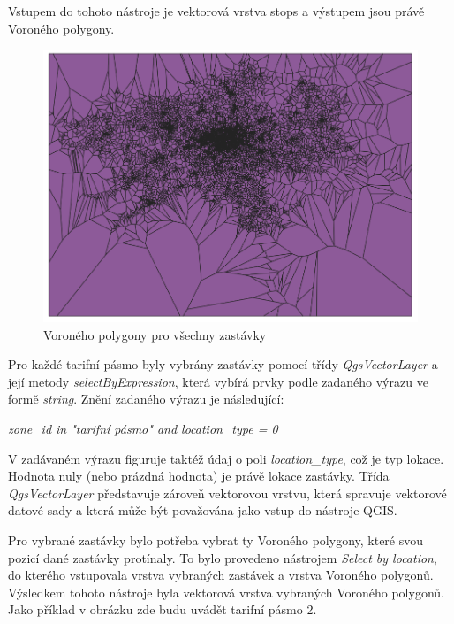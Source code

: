 Vstupem do tohoto nástroje je vektorová vrstva stops a výstupem jsou právě Voroného polygony.

\begin{figure}[H] \centering
    \includegraphics[width=400pt]{./pictures/voronoi-stops.png}
    \caption[Voroného polygony pro všechny zastávky]{Voroného polygony pro všechny zastávky}
	\label{fig:voronoi-stops}              
\end{figure}
  
Pro každé tarifní pásmo byly vybrány zastávky pomocí třídy \textit{QgsVectorLayer}
a její metody \textit{selectByExpression}, která vybírá prvky podle zadaného výrazu ve formě \textit{string}.
Znění zadaného výrazu je následující:

\textit{zone\_id in "tarifní pásmo" and location\_type = 0}

V zadávaném výrazu figuruje taktéž údaj o poli \textit{location\_type}, což je typ lokace. 
Hodnota nuly (nebo prázdná hodnota) je právě lokace zastávky. 
Třída \textit{QgsVectorLayer} představuje zároveň vektorovou vrstvu, která spravuje
vektorové datové sady a která může být považována jako vstup do nástroje QGIS. %

Pro vybrané zastávky bylo potřeba vybrat ty Voroného polygony, které svou
pozicí dané zastávky protínaly. To bylo provedeno nástrojem \textit{Select by location},
do kterého vstupovala vrstva vybraných zastávek a vrstva Voroného polygonů. Výsledkem tohoto nástroje byla
vektorová vrstva vybraných Voroného polygonů. Jako příklad v obrázku zde budu uvádět tarifní pásmo 2.

